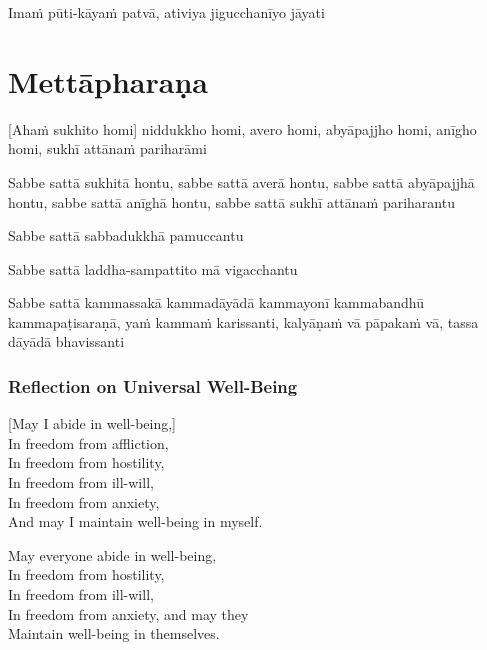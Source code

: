 Imaṁ pūti-kāyaṁ patvā, ativiya jigucchanīyo jāyati


\section{Mettāpharaṇa}

\begin{leader}
\end{leader}


[Ahaṁ sukhito homi] niddukkho homi, avero homi, abyāpajjho homi, anīgho homi,
sukhī attānaṁ pariharāmi

Sabbe sattā sukhitā hontu, sabbe sattā averā hontu, sabbe sattā abyāpajjhā
hontu, sabbe sattā anīghā hontu, sabbe sattā sukhī attānaṁ pariharantu

Sabbe sattā sabbadukkhā pamuccantu

Sabbe sattā laddha-sampattito mā vigacchantu

Sabbe sattā kammassakā kammadāyādā kammayonī kammabandhū kammapaṭisaraṇā,
yaṁ kammaṁ karissanti, kalyāṇaṁ vā pāpakaṁ vā, tassa dāyādā bhavissanti


\subsubsection{Reflection on Universal Well-Being}

\enlargethispage{\baselineskip}

\begin{leader}
\end{leader}


[May I abide in well-being,]\\
In freedom from affliction,\\
In freedom from hostility,\\
In freedom from ill-will,\\
In freedom from anxiety,\\
And may I maintain well-being in myself.

May everyone abide in well-being,\\
In freedom from hostility,\\
In freedom from ill-will,\\
In freedom from anxiety, and may they\\
Maintain well-being in themselves.

